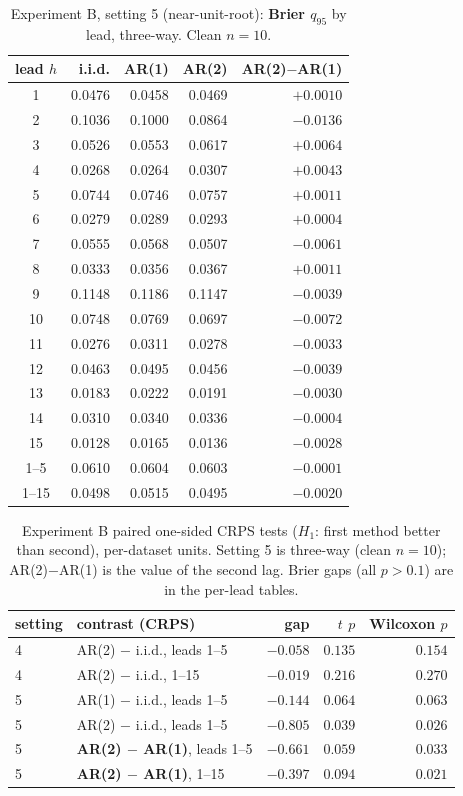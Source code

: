 \documentclass[11pt]{article}
\begin{document}
\begin{table}[ht]
\centering
\caption{Experiment B, setting 5 (near-unit-root): \textbf{Brier $q_{95}$} by
lead, three-way. Clean $n = 10$.}
\label{tab:expB5brier}
\small
\begin{tabular}{crrrr}
\toprule
lead $h$ & i.i.d. & AR(1) & AR(2) & AR(2)$-$AR(1) \\
\midrule
1 & 0.0476 & 0.0458 & 0.0469 & $+0.0010$ \\
2 & 0.1036 & 0.1000 & 0.0864 & $-0.0136$ \\
3 & 0.0526 & 0.0553 & 0.0617 & $+0.0064$ \\
4 & 0.0268 & 0.0264 & 0.0307 & $+0.0043$ \\
5 & 0.0744 & 0.0746 & 0.0757 & $+0.0011$ \\
6 & 0.0279 & 0.0289 & 0.0293 & $+0.0004$ \\
7 & 0.0555 & 0.0568 & 0.0507 & $-0.0061$ \\
8 & 0.0333 & 0.0356 & 0.0367 & $+0.0011$ \\
9 & 0.1148 & 0.1186 & 0.1147 & $-0.0039$ \\
10 & 0.0748 & 0.0769 & 0.0697 & $-0.0072$ \\
11 & 0.0276 & 0.0311 & 0.0278 & $-0.0033$ \\
12 & 0.0463 & 0.0495 & 0.0456 & $-0.0039$ \\
13 & 0.0183 & 0.0222 & 0.0191 & $-0.0030$ \\
14 & 0.0310 & 0.0340 & 0.0336 & $-0.0004$ \\
15 & 0.0128 & 0.0165 & 0.0136 & $-0.0028$ \\
\midrule
1--5 & 0.0610 & 0.0604 & 0.0603 & $-0.0001$ \\
1--15 & 0.0498 & 0.0515 & 0.0495 & $-0.0020$ \\
\bottomrule
\end{tabular}
\end{table}

\begin{table}[ht]
\centering
\caption{Experiment B paired one-sided CRPS tests ($H_1$: first method
better than second), per-dataset units. Setting 5 is three-way (clean
$n = 10$); AR(2)$-$AR(1) is the value of the second lag. Brier gaps (all
$p > 0.1$) are in the per-lead tables.}
\label{tab:tests}
\small
\begin{tabular}{llrrr}
\toprule
setting & contrast (CRPS) & gap & $t$ $p$ & Wilcoxon $p$ \\
\midrule
4 & AR(2) $-$ i.i.d., leads 1--5   & $-0.058$ & $0.135$ & $0.154$ \\
4 & AR(2) $-$ i.i.d., 1--15        & $-0.019$ & $0.216$ & $0.270$ \\
\midrule
5 & AR(1) $-$ i.i.d., leads 1--5   & $-0.144$ & $0.064$ & $0.063$ \\
5 & AR(2) $-$ i.i.d., leads 1--5   & $-0.805$ & $0.039$ & $\mathbf{0.026}$ \\
5 & \textbf{AR(2) $-$ AR(1)}, leads 1--5 & $-0.661$ & $0.059$ & $\mathbf{0.033}$ \\
5 & \textbf{AR(2) $-$ AR(1)}, 1--15 & $-0.397$ & $0.094$ & $\mathbf{0.021}$ \\
\bottomrule
\end{tabular}
\end{table}
\end{document}
